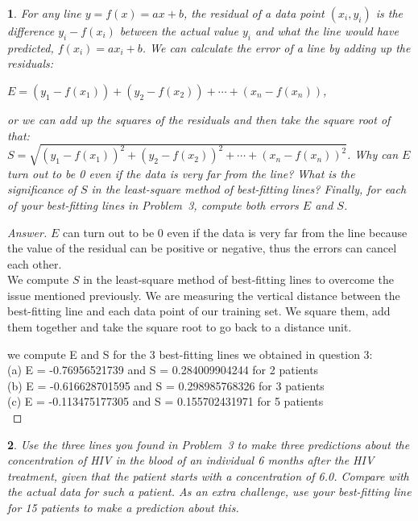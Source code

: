 \documentclass [11pt, letterpaper] {amsart}
\theoremstyle{plain}
\newtheorem{exer}{}
\theoremstyle{definition}
\begin{document}
\vspace{0.05in}
\begin{exer} 
For any line $y=f(x)=ax+b$, the \textit{residual} of a data point $(x_i,y_i)$ is the difference $y_i-f(x_i)$ between the actual value $y_i$ and what the line would have predicted, $f(x_i)=ax_i+b$. We can calculate the error of a line by adding up the residuals:

\centerline{$E= (y_1-f(x_1))+(y_2-f(x_2))+\cdots+(x_n-f(x_n))$,} 
\noindent or we can add up the \textit{squares} of the residuals and then take the square root of that: \\
$S=\sqrt{(y_1-f(x_1))^2+(y_2-f(x_2))^2+\cdots+(x_n-f(x_n))^2}$.
Why can $E$ turn out to be 0 even if the data is very far from the line? What is the significance of $S$ in the least-square method of best-fitting lines? Finally, for each of your best-fitting lines in Problem~3, compute both errors $E$ and $S$.
\end{exer}

\begin{proof}[Answer]
$E$ can turn out to be 0 even if the data is very far from the line because the value of the residual can be positive or negative, thus the errors can cancel each other. \\
We compute $S$ in the least-square method of best-fitting lines to overcome the issue mentioned previously. We are measuring the vertical distance between the best-fitting line and each data point of our training set. We square them, add them together and take the square root to go back to a distance unit.

we compute E and S for the 3 best-fitting lines we obtained in question 3:\\
(a) E = -0.76956521739 and S = 0.284009904244 for 2 patients\\
(b) E = -0.616628701595 and S = 0.298985768326  for 3 patients\\
(c) E = -0.113475177305 and S = 0.155702431971  for 5 patients\\

\end{proof}





\vspace{0.05in}
\begin{exer} 
Use the three lines you found in Problem~3 to make three predictions about the concentration of HIV in the blood of an individual 6 months after the HIV treatment, given that the patient starts with a concentration of 6.0. Compare with the actual data for such a patient. As an extra challenge, use your best-fitting line for 15 patients to make a prediction about this.
\end{exer}
\end{document}
